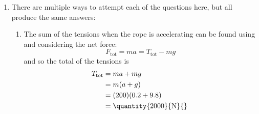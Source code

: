 \begin{problem}
{\begin{enumerate}
To find the tensions, we need to consider the moments about the two points where the ropes are attached, since this removes one tension from the equations each time. The rod is in equilibrium, so the total moment about any point must be zero. Thus taking moments about the point where  acts will allow  to be found and vice versa. The moments about the point  acts:
\begin{align*}
(T_{1})(l - 2s) - (mg)(d - s) = 0 
\end{align*}
\begin{align*} 
T_{1} &= \frac{mg(d - s)}{l - 2s} \\ 
&= \frac{(200 \times 9.8)(4 - 1)}{(10 - 2)} \\
 &= \mbox{\quantity{735}{N}}
 \end{align*}
where the trickiest part is working out the distance to the point where the forces act.
Repeating the process to find  gives:
\begin{align*}
(T_{2})(l - 2s) - (mg)(l - d - s) = 0 
\end{align*}
\begin{align*} T_{2} &= \frac{mg(l - d - s)}{l - 2s} \\ 
&= \frac{(200 \times 9.8)(10 - 4 - 1)}{(10 - 2)} \\ 
&= \mbox{\quantity{1225}{N}}
\end{align*}
and a quick check that the net force on the rod is zero:  so check for our calculated values  $=$  as required.
	\item There are multiple ways to attempt each of the questions here, but all produce the same answers:
	\begin{enumerate}
		\item The sum of the tensions when the rope is accelerating can be found using  and considering the net force:
	\begin{equation*}
	 F_{\text{tot}} = ma = T_{\text{tot}} - mg 
	 \end{equation*} 
	 and so the total of the tensions is 
	 \begin{align*} T_{\text{tot}} &= ma + mg \\ 
	 &= m(a + g) \\ &= (200)(0.2 + 9.8) \\ 
	 &= \mbox{\quantity{2000}{N}{} }
	 \end{align*}

\end{enumerate}
\end{enumerate}}
\end{problem}

